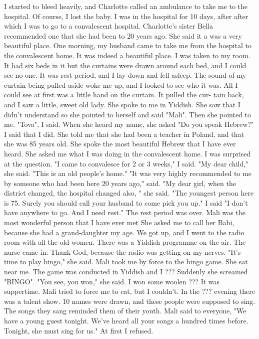 I started to bleed heavily, and Charlotte called an ambulance to take me to the 
hospital. Of course, I lost the baby. 
I was in the hospital for 10 days, after after which I was to go to a convalescent
hospital. Charlotte's sister Bella recommended one that she had been to 20 years ago. 
She said it a was a very beautiful place. One morning, my husband came to take me from
the hospital to the convalescent home. 
It was indeed a beautiful place. I was taken to my room. It had six beds in it 
but the curtains were drawn around each bed, and I could see no-one. It was rest period, and I lay down and fell asleep. 
The sound of my curtain being pulled aside woke me up, and I looked to see who it 
was. All I could see at first was a little hand on the curtain. It pulled the cur-
tain back, and I saw a little, sweet old lady. She spoke to me in Yiddish. She saw 
that I didn't understand so she pointed to herself and said "Mali". Then she pointed 
to me. "Tova", I said. When she heard my name, she asked "Do you speak Hebrew?" 
I said that I did. 
She told me that she had been a teacher in Poland, and that she was 85 years old. 
She spoke the most beautiful Hebrew that I have ever heard. She asked me what I was 
doing in the convalescent home. I was surprised at the question. 
"I came to convalesce for 2 or 3 weeks," I said. 
"My dear child," she said. "This is an old people's home." 
"It was very highly recommended to me by someone who had been here 20 years ago," 
said. 
"My dear girl, when the district changed, the hospital changed also, " she said. 
"The youngest person here is 75. Surely you should call your husband to come pick you 
up." 
I said "I don't have anywhere to go. And I need rest." 
The rest period was over. Mali was the most wonderful person that I have ever met 
She asked me to call her Babi, because she had a grand-daughter my age. We got up, and 
I went to the radio room with all the old women. There was a Yiddish programme 
on the air. The nurse came in. Thank God, because the radio was getting on my nerves. 
"It's time to play bingo," she said. 
Mali took me by force to the bingo game. She sat near me. The game was conducted 
in Yiddish and I ???
Suddenly she screamed "BINGO". "You see, you won," she said. I won some woolen ???
It was suppertime. Mali tried to force me to eat, but I couldn't. In the ??? evening
there was a talent show. 10 names were drawn, and these people were supposed to 
sing. The songs they sang reminded them of their youth. Mali said to everyone, "We 
have a young guest tonight. We've heard all your songs a hundred times before. Tonight, she must sing for us." At first I refused. 
